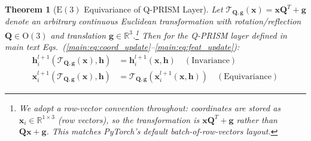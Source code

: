 \documentclass[10pt,twocolumn,letterpaper]{article}
\newtheorem{theorem}{Theorem}
\begin{document}
\begin{theorem}[$\mathrm{E}(3)$ Equivariance of Q-PRISM Layer]
\label{thm:equivariance}
Let $\mathcal{T}_{\mathbf{Q}, \mathbf{g}}(\mathbf{x}) = \mathbf{x} \mathbf{Q}^T + \mathbf{g}$ denote an arbitrary continuous Euclidean transformation with rotation/reflection $\mathbf{Q} \in \mathrm{O}(3)$ and translation $\mathbf{g} \in \mathbb{R}^3$.\footnote{We adopt a row-vector convention throughout: coordinates are stored as $\mathbf{x}_i \in \mathbb{R}^{1 \times 3}$ (row vectors), so the transformation is $\mathbf{x} \mathbf{Q}^T + \mathbf{g}$ rather than $\mathbf{Q}\mathbf{x} + \mathbf{g}$. This matches PyTorch's default batch-of-row-vectors layout.} Then for the Q-PRISM layer defined in main text Eqs.~(\ref{main:eq:coord_update}--\ref{main:eq:feat_update}):
\begin{align}
    \mathbf{h}_i^{l+1}(\mathcal{T}_{\mathbf{Q}, \mathbf{g}}(\mathbf{x}), \mathbf{h}) &= \mathbf{h}_i^{l+1}(\mathbf{x}, \mathbf{h}) \quad (\text{Invariance}) \\
    \mathbf{x}_i^{l+1}(\mathcal{T}_{\mathbf{Q}, \mathbf{g}}(\mathbf{x}), \mathbf{h}) &= \mathcal{T}_{\mathbf{Q}, \mathbf{g}}(\mathbf{x}_i^{l+1}(\mathbf{x}, \mathbf{h})) \quad (\text{Equivariance})
\end{align}
\end{theorem}
\end{document}
